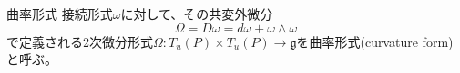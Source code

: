 	\begin{dfn}{曲率形式}
		接続形式$\omega$に対して、その共変外微分
			\[\Omega = D\omega = d\omega + \omega \wedge \omega\]
		で定義される2次微分形式$\Omega: T_u(P) \times T_u(P) \rightarrow \mathfrak{g}$を曲率形式(curvature form)と呼ぶ。
	\end{dfn}




